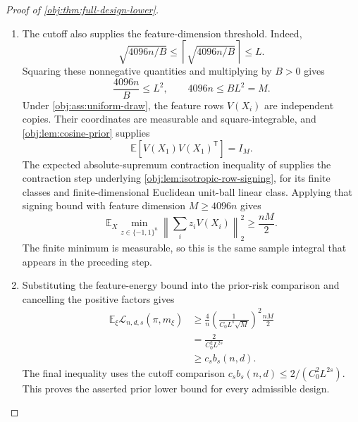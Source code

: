 \documentclass[11pt]{article}
\begin{document}
\begin{proof}[Proof of \cref{obj:thm:full-design-lower}]
\begin{enumerate}
\item
The cutoff also supplies the feature-dimension threshold. Indeed,
\[
\sqrt{4096n/B}
\leq\left\lceil\sqrt{4096n/B}\right\rceil
\leq L.
\]
Squaring these nonnegative quantities and multiplying by \(B>0\) gives
\[
\frac{4096n}{B}\leq L^2,
\qquad
4096n\leq BL^2=M.
\]
Under \cref{obj:ass:uniform-draw}, the feature rows \(V(X_i)\) are independent copies. Their coordinates are measurable and square-integrable, and
\cref{obj:lem:cosine-prior} supplies
\[
\mathbb E\!\left[V(X_1)V(X_1)^{\mathsf T}\right]=I_M.
\]
The expected absolute-supremum contraction inequality of
\citep[Theorem~12(4), with Rademacher complexity as in Definition~2]{BartlettMendelson2002Complexities}
supplies the contraction step underlying \cref{obj:lem:isotropic-row-signing}, for its finite classes and finite-dimensional Euclidean unit-ball linear class. Applying that signing bound with feature dimension \(M\geq4096n\) gives
\[
\mathbb E_X
 \min_{z\in\{-1,1\}^n}
 \left\|\sum_i z_iV(X_i)\right\|_2^2
\geq\frac{nM}{2}.
\]
The finite minimum is measurable, so this is the same sample integral that appears in the preceding step.

\item
Substituting the feature-energy bound into the prior-risk comparison and cancelling the positive factors gives
\[
\begin{aligned}
\mathbb E_\xi\mathcal L_{n,d,s}(\pi,m_\xi)
&\geq
\frac4n\left(\frac{1}{C_0L^s\sqrt M}\right)^2
\frac{nM}{2}\\
&=\frac{2}{C_0^2L^{2s}}\\
&\geq c_sb_s(n,d).
\end{aligned}
\]
The final inequality uses the cutoff comparison \(c_sb_s(n,d)\leq 2/(C_0^2L^{2s})\). This proves the asserted prior lower bound for every admissible design.


\end{enumerate}
\end{proof}
\end{document}
